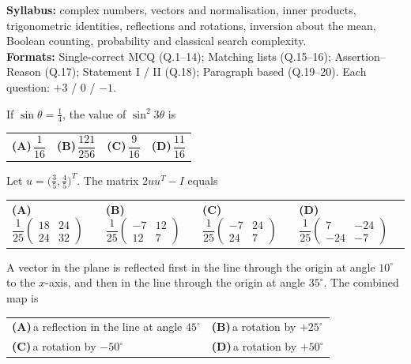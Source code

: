 \documentclass[11pt,a4paper]{article}
\newcommand{\optlabel}[1]{\textbf{(#1)}}
\newenvironment{qitem}[1]{\begin{list}{}{\setlength{\leftmargin}{3.3em}\setlength{\labelwidth}{3.1em}%
  \setlength{\labelsep}{0.2em}\setlength{\topsep}{3pt}\setlength{\parsep}{3pt}}\item[\textbf{Q.#1}\hfill]}{\end{list}}
\newcommand{\qsep}{\par\vspace{2pt}{\color{black!15}\hrule}\vspace{4pt}}
\begin{document}
{\small \textbf{Syllabus:} complex numbers, vectors and normalisation, inner products, trigonometric identities, reflections and rotations, inversion about the mean, Boolean counting, probability and classical search complexity.\\ \textbf{Formats:} Single-correct MCQ (Q.1--14); Matching lists (Q.15--16); Assertion--Reason (Q.17); Statement I / II (Q.18); Paragraph based (Q.19--20). Each question: $+3$ / $0$ / $-1$.}
\par\medskip

\begin{qitem}{1}
If $\sin\theta = \tfrac14$, the value of $\sin^2 3\theta$ is
\par\smallskip\noindent\begin{tabularx}{\linewidth}{@{}*{4}{L}@{}}
\optlabel{A}\,$\dfrac{1}{16}$ & \optlabel{B}\,$\dfrac{121}{256}$ & \optlabel{C}\,$\dfrac{9}{16}$ & \optlabel{D}\,$\dfrac{11}{16}$
\end{tabularx}
\end{qitem}
\qsep

\begin{qitem}{2}
Let $u = \big(\tfrac35, \tfrac45\big)^{T}$. The matrix $2uu^{T} - I$ equals
\par\smallskip\noindent\begin{tabularx}{\linewidth}{@{}*{4}{L}@{}}
\optlabel{A}\,$\dfrac{1}{25}\begin{pmatrix}18 & 24\\ 24 & 32\end{pmatrix}$ & \optlabel{B}\,$\dfrac{1}{25}\begin{pmatrix}-7 & 12\\ 12 & 7\end{pmatrix}$ & \optlabel{C}\,$\dfrac{1}{25}\begin{pmatrix}-7 & 24\\ 24 & 7\end{pmatrix}$ & \optlabel{D}\,$\dfrac{1}{25}\begin{pmatrix}7 & -24\\ -24 & -7\end{pmatrix}$
\end{tabularx}
\end{qitem}
\qsep

\begin{qitem}{3}
A vector in the plane is reflected first in the line through the origin at angle $10^\circ$ to the $x$-axis, and then in the
line through the origin at angle $35^\circ$. The combined map is
\par\smallskip\noindent\begin{tabularx}{\linewidth}{@{}*{2}{L}@{}}
\optlabel{A}\,a reflection in the line at angle $45^\circ$ & \optlabel{B}\,a rotation by $+25^\circ$ \\[3pt]
\optlabel{C}\,a rotation by $-50^\circ$ & \optlabel{D}\,a rotation by $+50^\circ$
\end{tabularx}
\end{qitem}
\qsep
\end{document}
